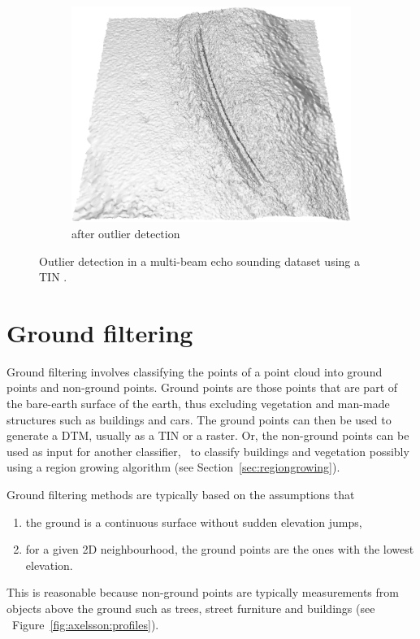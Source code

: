 \begin{figure}
\begin{subfigure}[b]{0.4\linewidth}
    \includegraphics[width=\textwidth]{figs/mbes_cleaning_after.png}
    \caption{after outlier detection}
  \end{subfigure}
\caption{Outlier detection in a multi-beam echo sounding dataset using a TIN \citep{Arge10}.}%
\label{fig:mbes}
\end{figure}


%

\section{Ground filtering}
Ground filtering involves classifying the points of a point cloud into ground points and non-ground points.
Ground points are those points that are part of the bare-earth surface of the earth, thus excluding vegetation and man-made structures such as buildings and cars.
The ground points can then be used to generate a DTM, usually as a TIN or a raster.
Or, the non-ground points can be used as input for another classifier, \eg\ to classify buildings and vegetation possibly using a region growing algorithm (see Section~\ref{sec:regiongrowing}).

Ground filtering methods are typically based on the assumptions that 
\begin{enumerate}
  \item the ground is a continuous surface without sudden elevation jumps, 
  \item for a given 2D neighbourhood, the ground points are the ones with the lowest elevation.
\end{enumerate}
This is reasonable because non-ground points are typically measurements from objects above the ground such as trees, street furniture and buildings (see \eg\ Figure~\ref{fig:axelsson:profiles}).


